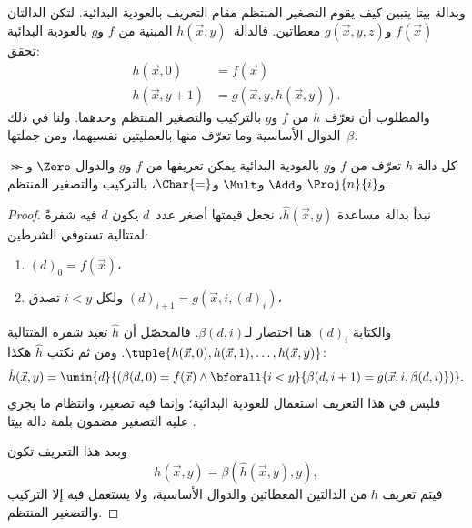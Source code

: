 \documentclass[../../../include/open-logic-section]{subfiles}
\begin{document}

وبدالة بيتا يتبين كيف يقوم التصغير المنتظم مقام التعريف بالعودية
البدائية. لتكن الدالتان $f(\vec x)$ و$g(\vec x,y,z)$ معطاتين.
فالدالة~$h(\vec x,y)$ المبنية من $f$ و$g$ بالعودية البدائية تحقق:
\begin{align*}
h(\vec x, 0) & =  f(\vec x) \\
h(\vec x, y+1) & =  g(\vec x, y, h(\vec x, y)).
\end{align*}
والمطلوب أن نعرّف $h$ من $f$ و$g$ بالتركيب والتصغير المنتظم وحدهما.
ولنا في ذلك الدوال الأساسية وما تعرّف منها بالعمليتين نفسيهما،
ومن جملتها~$\beta$.

\begin{lem}
كل دالة $h$ تعرّف من $f$ و$g$ بالعودية البدائية يمكن تعريفها من
$f$ و$g$ والدوال $\Zero$ و$\Succ$ و$\Proj{n}{i}$ و$\Add$
و$\Mult$ و$\Char{=}$، بالتركيب والتصغير المنتظم.
\end{lem}

\begin{proof}
نبدأ بدالة مساعدة $\hat h(\vec x,y)$، نجعل قيمتها أصغر عدد~$d$
يكون $d$ فيه شفرةً لمتتالية تستوفي الشرطين:
\begin{enumerate}
\item $(d)_0=f(\vec x)$،
\item ولكل $i<y$ تصدق $(d)_{i+1}=g(\vec x,i,(d)_i)$،
\end{enumerate}
والكتابة $(d)_i$ هنا اختصار لـ$\beta(d,i)$.
فالمحصّل أن $\hat h$ تعيد شفرة المتتالية
$\tuple{h(\vec x,0),h(\vec x,1),\dots,h(\vec x,y)}$.
ومن ثم نكتب $\hat h$ هكذا:
\[
\hat h(\vec x, y) = \umin{d}{(\beta(d,0) = f(\vec x) \land \bforall{i <
  y}{\beta(d,i+1) = g(\vec x, i,\beta(d,i)})}.
\]
فليس في هذا التعريف استعمال للعودية البدائية؛ وإنما فيه تصغير،
وانتظام ما يجري عليه التصغير مضمون بلمة دالة بيتا
.

وبعد هذا التعريف تكون
\[
h(\vec x, y) = \beta(\hat h(\vec x, y), y),
\]
فيتم تعريف $h$ من الدالتين المعطاتين والدوال الأساسية، ولا يستعمل فيه
إلا التركيب والتصغير المنتظم.
\end{proof}
\end{document}
